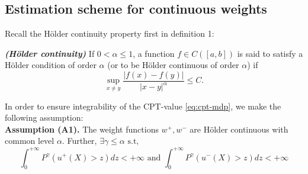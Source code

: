 \documentclass[11pt,letterpaper,english]{article}
\begin{document}
% 

\subsection{Estimation scheme for \holder continuous weights}
Recall the H\"{o}lder continuity property first in definition 1:
\begin{definition}
{\textbf{\textit{(H\"{o}lder continuity)}}}
If $0 < \alpha \leq 1$, a function $f \in C([a,b])$ is said to satisfy
a H\"{o}lder condition of order $\alpha$ (or to be H\"{o}lder continuous
of order $\alpha$) if
\[
\sup_{x \neq y} \frac{| f(x) - f(y) |}{| x-y |^{\alpha}} \leq C .
\]
\end{definition}

In order to ensure integrability of the CPT-value \eqref{eq:cpt-mdp}, we make the following assumption:\\[1ex]
\textbf{Assumption (A1).}  
The weight functions $w^+, w^-$ are H\"{o}lder continuous with common level $\alpha$. Further,
$\exists \gamma \le \alpha \text{   s.t,  }$ 
$$\int_0^{+\infty} P^{\gamma} (u^+(X)>z) dz < +\infty \text{ and }\int_0^{+\infty} P^{\gamma} (u^-(X)>z) dz < +\infty$$
\end{document}
